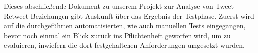 Dieses abschließende Dokument zu unserem Projekt zur Analyse von Tweet-Retweet-Beziehungen gibt Auskunft über das Ergebnis der Testphase.
Zuerst wird auf die durchgeführten automatisierten, wie auch manuellen Tests eingegangen, bevor noch einmal ein Blick zurück ins Pflichtenheft geworfen wird, um zu evaluieren, inwiefern die dort festgehaltenen Anforderungen umgesetzt wurden. 
